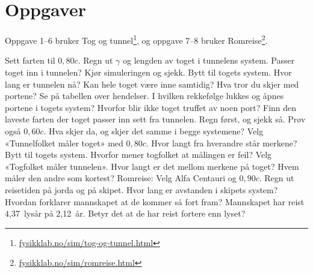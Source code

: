 \documentclass[11pt]{article}
\begin{document}

\section*{Oppgaver}

Oppgave 1–6 bruker Tog og tunnel\footnote{\url{fysikklab.no/sim/tog-og-tunnel.html}}, og oppgave 7–8 bruker Romreise\footnote{\url{fysikklab.no/sim/romreise.html}}.

\begin{oppgaveliste}
\oppgave {}Sett farten til $0{,}80c$. Regn ut $γ$ og lengden av toget i tunnelens system. Passer toget inn i tunnelen? Kjør simuleringen og sjekk.
\svar
\oppgave {}Bytt til togets system. Hvor lang er tunnelen nå? Kan hele toget være inne samtidig? Hva tror du skjer med portene?
\svar
\oppgave {}Se på tabellen over hendelser. I hvilken rekkefølge lukkes og åpnes portene i togets system? Hvorfor blir ikke toget truffet av noen port?
\svar
\oppgave {}Finn den laveste farten der toget passer inn sett fra tunnelen. Regn først, og sjekk så. Prøv også $0{,}60c$. Hva skjer da, og skjer det samme i begge systemene?
\svar
\oppgave {}Velg «Tunnelfolket måler toget» med $0{,}80c$. Hvor langt fra hverandre står merkene? Bytt til togets system. Hvorfor mener togfolket at målingen er feil?
\svar
\oppgave {}Velg «Togfolket måler tunnelen». Hvor langt er det mellom merkene på toget? Hvem måler den andre som kortest?
\svar
\oppgave {}Romreise: Velg Alfa Centauri og $0{,}90c$. Regn ut reisetiden på jorda og på skipet. Hvor lang er avstanden i skipets system? Hvordan forklarer mannskapet at de kommer så fort fram?
\svar
\oppgave {}Mannskapet har reist 4,37~lysår på 2,12~år. Betyr det at de har reist fortere enn lyset?
\svar
\end{oppgaveliste}
\end{document}
